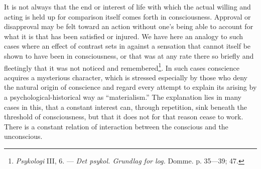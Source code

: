 \documentclass[12pt,a4paper,openany]{book}
\newcommand{\opage}[1]{\marginnote{\footnotesize\textit{[#1]}}}
\begin{document}
It is not always that the end or interest of life with which the actual willing and acting is held up
for comparison itself comes forth in consciousness. Approval or disapproval may be felt toward an
action without one's being able to account for what it is that has been satisfied or injured. We
\opage{83}have here an analogy to such cases where an effect of contrast sets in against a sensation that cannot
itself be shown to have been in consciousness, or that was at any rate there so briefly and fleetingly
that it was not noticed and remembered\footnote[1]{\textit{Psykologi} III, 6. --- \textit{Det psykol.
Grundlag for log.} Domme. p. 35---39; 47.}. In such cases conscience acquires a mysterious character,
which is stressed especially by those who deny the natural origin of conscience and regard every
attempt to explain its arising by a psychological-historical way as ``materialism.'' The explanation
lies in many cases in this, that a constant interest can, through repetition, sink beneath the
threshold of consciousness, but that it does not for that reason cease to work. There is a constant
relation of interaction between the conscious and the unconscious.
\end{document}
